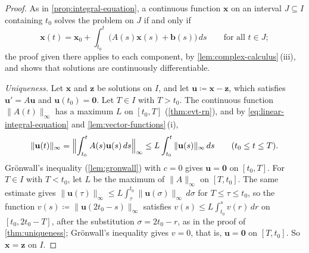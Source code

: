 \begin{proof}
As in \cref{prop:integral-equation}, a continuous function $\mathbf x$ on an interval $J\subseteq I$ containing $t_0$ solves the problem on $J$ if and only if
\begin{equation}
\mathbf x(t)=\mathbf x_0+\int_{t_0}^t\bigl(A(s)\mathbf x(s)+\mathbf b(s)\bigr)\,ds\qquad\text{for all }t\in J ;
\label{eq:linear-integral-equation}
\end{equation}
the proof given there applies to each component, by \cref{lem:complex-calculus}\,(iii), and shows that solutions are continuously differentiable.

\emph{Uniqueness.} Let $\mathbf x$ and $\mathbf z$ be solutions on $I$, and let $\mathbf u\coloneqq\mathbf x-\mathbf z$, which satisfies $\mathbf u'=A\mathbf u$ and $\mathbf u(t_0)=\mathbf 0$. Let $T\in I$ with $T>t_0$. The continuous function $\|A(t)\|_\infty$ has a maximum $L$ on $[t_0,T]$ (\cref{thm:evt-rn}), and by \eqref{eq:linear-integral-equation} and \cref{lem:vector-functions}\,(i),
\[
\|\mathbf u(t)\|_\infty=\Bigl\|\int_{t_0}^tA(s)\mathbf u(s)\,ds\Bigr\|_\infty\le L\int_{t_0}^t\|\mathbf u(s)\|_\infty\,ds\qquad(t_0\le t\le T).
\]
Gr\"onwall's inequality (\cref{lem:gronwall}) with $c=0$ gives $\mathbf u=\mathbf 0$ on $[t_0,T]$. For $T\in I$ with $T<t_0$, let $L$ be the maximum of $\|A\|_\infty$ on $[T,t_0]$. The same estimate gives $\|\mathbf u(\tau)\|_\infty\le L\int_\tau^{t_0}\|\mathbf u(\sigma)\|_\infty\,d\sigma$ for $T\le\tau\le t_0$, so the function $v(s)\coloneqq\|\mathbf u(2t_0-s)\|_\infty$ satisfies $v(s)\le L\int_{t_0}^sv(r)\,dr$ on $[t_0,2t_0-T]$, after the substitution $\sigma=2t_0-r$, as in the proof of \cref{thm:uniqueness}; Gr\"onwall's inequality gives $v=0$, that is, $\mathbf u=\mathbf 0$ on $[T,t_0]$. So $\mathbf x=\mathbf z$ on $I$.


\end{proof}
